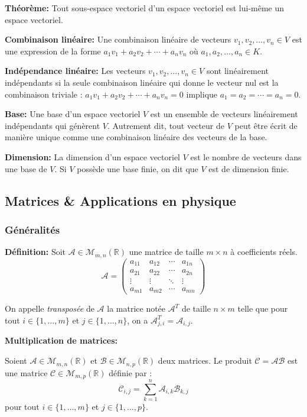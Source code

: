 \textbf{Théorème:}
Tout sous-espace vectoriel d'un espace vectoriel est lui-même un espace vectoriel.

\textbf{Combinaison linéaire:}
Une combinaison linéaire de vecteurs $v_1, v_2, \ldots, v_n \in V$ est une expression de la forme $a_1 v_1 + a_2 v_2 + \cdots + a_n v_n$ où $a_1, a_2, \ldots, a_n \in K$.

\textbf{Indépendance linéaire:}
Les vecteurs $v_1, v_2, \ldots, v_n \in V$ sont linéairement indépendants si la seule combinaison linéaire qui donne le vecteur nul est la combinaison triviale : $a_1 v_1 + a_2 v_2 + \cdots + a_n v_n = 0$ implique $a_1 = a_2 = \cdots = a_n = 0$.

\textbf{Base:}
Une base d'un espace vectoriel $V$ est un ensemble de vecteurs linéairement indépendants qui génèrent $V$. Autrement dit, tout vecteur de $V$ peut être écrit de manière unique comme une combinaison linéaire des vecteurs de la base.

\textbf{Dimension:}
La dimension d'un espace vectoriel $V$ est le nombre de vecteurs dans une base de $V$. Si $V$ possède une base finie, on dit que $V$ est de dimension finie.

\subsection{Matrices \& Applications en physique}

\subsubsection{Généralités}
\textbf{Définition:}
Soit $\mathcal{A}  \in \mathcal{M}_{m,n}(\mathbb{R})$ une matrice de taille $m \times n$ à coefficients réels. 
\[
\mathcal{A}  = \begin{pmatrix}
a_{11} & a_{12} & \cdots & a_{1n} \\
a_{21} & a_{22} & \cdots & a_{2n} \\
\vdots & \vdots & \ddots & \vdots \\
a_{m1} & a_{m2} & \cdots & a_{mn}
\end{pmatrix}
\]

On appelle \textit{transposée} de $\mathcal{A}$ la matrice notée $\mathcal{A}^T$ de taille $n \times m$ telle que pour tout $i \in \{1, \ldots, m\}$ et $j \in \{1, \ldots, n\}$, on a $\mathcal{A}^T_{j,i} = \mathcal{A}_{i,j}$.


\textbf{Multiplication de matrices:}

Soient $\mathcal{A} \in \mathcal{M}_{m,n}(\mathbb{R})$ et $\mathcal{B} \in \mathcal{M}_{n,p}(\mathbb{R})$ deux matrices. Le produit $\mathcal{C} = \mathcal{A} \mathcal{B}$ est une matrice $\mathcal{C} \in \mathcal{M}_{m,p}(\mathbb{R})$ définie par :
\[
\mathcal{C}_{i,j} = \sum_{k=1}^{n} \mathcal{A}_{i,k} \mathcal{B}_{k,j}
\]
pour tout $i \in \{1, \ldots, m\}$ et $j \in \{1, \ldots, p\}$.

